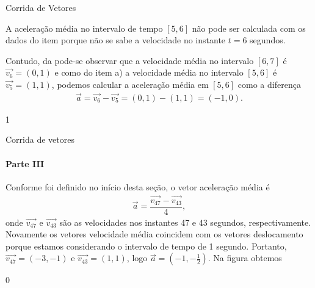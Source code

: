 \begin{answer}{Corrida de Vetores}
{\begin{enumerate}
A aceleração média no intervalo de tempo \([5,6]\) não pode ser calculada com os dados do item  porque não se sabe a velocidade no instante \(t=6\) segundos.

Contudo, da  pode-se observar que a velocidade média no intervalo \([6,7]\) é \(\vec{v_6}=(0,1)\) e como do item a) a velocidade média no intervalo \([5,6]\) é  \(\vec{v_5}=(1,1)\), podemos calcular a aceleração média em \([5,6]\) como a diferença
\begin{equation*}
\begin{split}
\vec{a} = \vec{v_6} - \vec{v_5} = (0,1) - (1,1) = (-1,0).
\end{split}
\end{equation*}
\end{enumerate}
}{1}
\end{answer}
\begin{answer}{Corrida de vetores}
{
\paragraph{Parte III}

Conforme foi definido no início desta seção, o vetor aceleração média é
\begin{equation*}
\begin{split}\vec{a} = \dfrac{\vec{v_{47}} - \vec{v_{43}}}{4},\end{split}
\end{equation*}
onde \(\vec{v_{47}}\) e \(\vec{v_{43}}\) são as velocidades nos instantes 47 e 43 segundos, respectivamente. Novamente os vetores velocidade média coincidem com os vetores deslocamento porque estamos considerando o intervalo de tempo de 1 segundo.
Portanto, \(\vec{v_{47}} = (-3,-1)\)  e \(\vec{v_{43}} = (1,1)\), logo \(\vec{a} = \left(-1,-\frac{1}{2}\right)\). Na figura obtemos
\begin{center}\end{center}
}{0}
\end{answer}


